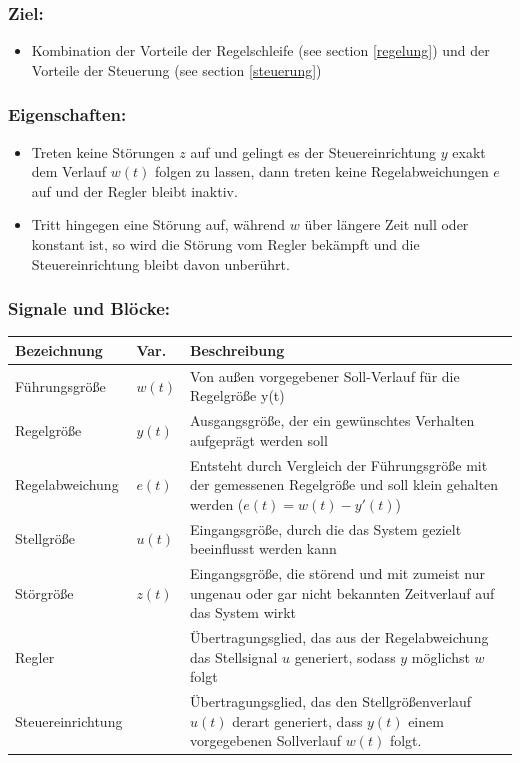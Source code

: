 \documentclass[10pt,a4paper]{article}
\begin{document}
\subsubsection*{Ziel:}
\begin{itemize}
		\item Kombination der Vorteile der Regelschleife (see section \ref{regelung}) und der Vorteile der Steuerung (see section \ref{steuerung})
\end{itemize}

\subsubsection*{Eigenschaften:}
\begin{itemize}
	\item Treten keine Störungen $z$ auf und gelingt es der Steuereinrichtung $y$ exakt dem Verlauf	$w(t)$ folgen zu lassen, dann treten keine Regelabweichungen $e$ auf und der Regler bleibt inaktiv.
	\item Tritt hingegen eine Störung auf, während $w$ über längere Zeit null oder konstant ist, so wird die Störung vom Regler bekämpft und die Steuereinrichtung bleibt davon unberührt.
\end{itemize}


\subsubsection*{Signale und Blöcke:}

\begin{tabularx}{\columnwidth}{llX}
	Bezeichnung & Var. & Beschreibung \\
	\hline
	Führungsgröße & $w(t)$ & Von außen vorgegebener Soll-Verlauf für die Regelgröße y(t) \\
	Regelgröße & $y(t)$ & Ausgangsgröße, der ein gewünschtes Verhalten aufgeprägt werden soll \\
	Regelabweichung & $e(t)$ & Entsteht durch Vergleich der Führungsgröße mit der gemessenen Regelgröße und soll klein gehalten werden ($e(t) = w(t) - y'(t)$) \\
	Stellgröße & $u(t)$ & Eingangsgröße, durch die das System gezielt beeinflusst werden kann \\
	Störgröße & $z(t)$ & Eingangsgröße, die störend und mit zumeist nur ungenau oder gar nicht bekannten Zeitverlauf auf das System wirkt \\
	Regler && Übertragungsglied, das aus der Regelabweichung das Stellsignal $u$ generiert, sodass $y$ möglichst $w$ folgt \\
	Steuereinrichtung && Übertragungsglied, das den Stellgrößenverlauf $u(t)$ derart generiert, dass $y(t)$ einem vorgegebenen Sollverlauf $w(t)$ folgt.
\end{tabularx}
\end{document}
